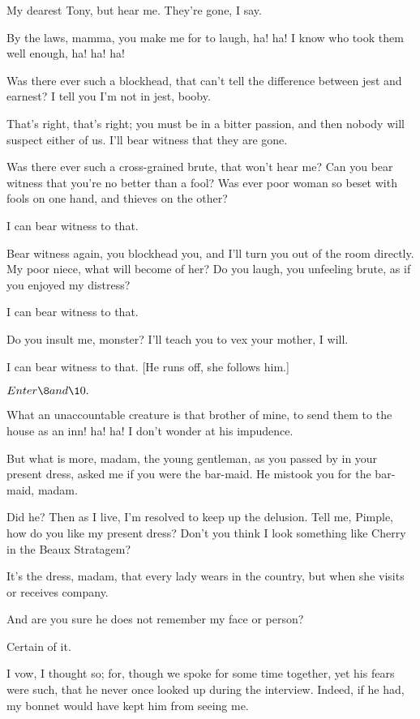 \documentclass{book}
\begin{document}
\7  My dearest Tony, but hear me.  They're gone, I say.

\5  By the laws, mamma, you make me for to laugh, ha! ha!  I know
who took them well enough, ha! ha! ha!

\7  Was there ever such a blockhead, that can't tell the
difference between jest and earnest?  I tell you I'm not in jest,
booby.

\5  That's right, that's right; you must be in a bitter passion, and
then nobody will suspect either of us.  I'll bear witness that they are
gone.

\7  Was there ever such a cross-grained brute, that
won't hear me?  Can you bear witness that you're no better than a
fool?  Was ever poor woman so beset with fools on one hand, and
thieves on the other?

\5  I can bear witness to that.

\7  Bear witness again, you blockhead you, and I'll turn
you out of the room directly.  My poor niece, what will become of her? 
Do you laugh, you unfeeling brute, as if you enjoyed my distress?

\5  I can bear witness to that.

\7  Do you insult me, monster?  I'll teach you to vex
your mother, I will.

\5  I can bear witness to that.  [He runs off, she follows him.]


\(Enter \8 and \10.\)


\8  What an unaccountable creature is that brother of
mine, to send them to the house as an inn! ha! ha!  I don't wonder at
his impudence.

  But what is more, madam, the young gentleman, as you passed by
in your present dress, asked me if you were the bar-maid.  He mistook
you for the bar-maid, madam.

\8  Did he?  Then as I live, I'm resolved to keep up the
delusion.  Tell me, Pimple, how do you like my present dress?  Don't
you think I look something like Cherry in the Beaux Stratagem?

  It's the dress, madam, that every lady wears in the country, but
when she visits or receives company.

\8  And are you sure he does not remember my face or
person?

  Certain of it.

\8  I vow, I thought so; for, though we spoke for some
time together, yet his fears were such, that he never once looked up
during the interview.  Indeed, if he had, my bonnet would have kept him
from seeing me.
\end{document}
